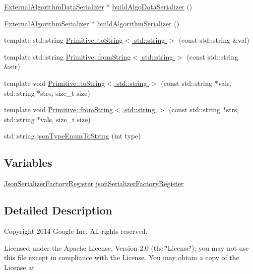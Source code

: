 \begin{DoxyCompactItemize}
\item 
\hyperlink{classBUSBOY_1_1ExternalAlgorithmDataSerializer}{ExternalAlgorithmDataSerializer} $\ast$ \hyperlink{namespaceBUSBOY_abe28e9b3e829acb3638a78f75cecf91c}{buildAlgoDataSerializer} ()
\item 
\hyperlink{classBUSBOY_1_1ExternalAlgorithmSerializer}{ExternalAlgorithmSerializer} $\ast$ \hyperlink{namespaceBUSBOY_a13b558c3160921511fc5451948a411a0}{buildAlgorithmSerializer} ()
\item 
template std::string \hyperlink{namespaceBUSBOY_a533d026b15dd61e6cecd58c893351a91}{Primitive::toString$<$ std::string $>$} (const std::string \&val)
\item 
template std::string \hyperlink{namespaceBUSBOY_ae9cfd49649c24e5866a81067a2787906}{Primitive::fromString$<$ std::string $>$} (const std::string \&str)
\item 
template void \hyperlink{namespaceBUSBOY_aaf1c55f7460aa06870133ce02137c52c}{Primitive::toString$<$ std::string $>$} (const std::string $\ast$vals, std::string $\ast$strs, size\_\-t size)
\item 
template void \hyperlink{namespaceBUSBOY_a07a2b3789d315b22647f060788aa72ab}{Primitive::fromString$<$ std::string $>$} (const std::string $\ast$strs, std::string $\ast$vals, size\_\-t size)
\item 
std::string \hyperlink{namespaceBUSBOY_a85e2c1eb3640b9f6f7a21a3992dfd900}{jsonTypeEnumToString} (int type)
\end{DoxyCompactItemize}
\subsection*{Variables}
\begin{DoxyCompactItemize}
\item 
\hyperlink{classBUSBOY_1_1JsonSerializerFactoryRegister}{JsonSerializerFactoryRegister} \hyperlink{namespaceBUSBOY_a214b8e47f93cf25f6a034c961ad58f2e}{jsonSerializerFactoryRegister}
\end{DoxyCompactItemize}


\subsection{Detailed Description}
Copyright 2014 Google Inc. All rights reserved.

Licensed under the Apache License, Version 2.0 (the \char`\"{}License\char`\"{}); you may not use this file except in compliance with the License. You may obtain a copy of the License at

